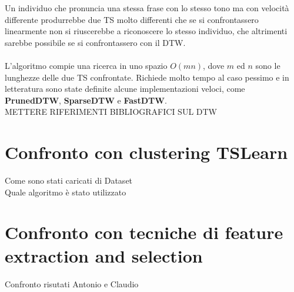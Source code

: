 Un individuo che pronuncia una stessa frase con lo stesso tono ma con velocità differente produrrebbe due TS molto differenti che se si confrontassero linearmente non si riuscerebbe a riconoscere lo stesso individuo, che altrimenti sarebbe possibile se si confrontassero con il DTW.\\
\\
L'algoritmo compie una ricerca in uno spazio $O(mn)$, dove $m$ ed $n$ sono le lunghezze delle due TS confrontate. Richiede molto tempo al caso pessimo e in letteratura sono state definite alcune implementazioni veloci, come \textbf{PrunedDTW}, \textbf{SparseDTW} e \textbf{FastDTW}.
\\
METTERE RIFERIMENTI BIBLIOGRAFICI SUL DTW

\section{Confronto con clustering TSLearn}
Come sono stati caricati di Dataset\\
Quale algoritmo è stato utilizzato\\

\section{Confronto con tecniche di feature extraction and selection}
Confronto risutati Antonio e Claudio

